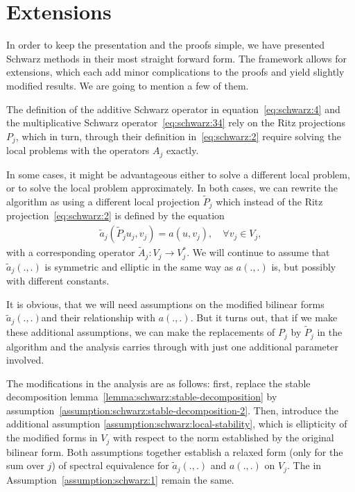 \section{Extensions}

\begin{intro}
  In order to keep the presentation and the proofs simple, we have
  presented Schwarz methods in their most straight forward form. The
  framework allows for extensions, which each add minor
  complications to the proofs and yield slightly modified results. We
  are going to mention a few of them.
\end{intro}

\begin{remark}
  The definition of the additive Schwarz operator in
  equation~\eqref{eq:schwarz:4} and the multiplicative Schwarz
  operator~\eqref{eq:schwarz:34} rely on the Ritz projections $P_j$,
  which in turn, through their definition in~\eqref{eq:schwarz:2}
  require solving the local problems with the operators $A_j$ exactly.
  
  In some cases, it might be advantageous either to solve a different
  local problem, or to solve the local problem approximately. In both
  cases, we can rewrite the algorithm as using a different local
  projection $\widetilde P_j$ which instead of the Ritz
  projection~\eqref{eq:schwarz:2} is defined by the equation
  \begin{gather}
    \label{eq:schwarz:42}
    \widetilde a_j (\widetilde P_j u_j,v_j) = a(u,v_j),\quad\forall v_j\in V_j,
  \end{gather}
  with a corresponding operator $\widetilde A_j: V_j \to V_j^*$. We
  will continue to assume that $\widetilde a_j (.,.)$ is symmetric and
  elliptic in the same way as $a(.,.)$ is, but possibly with different
  constants.

  It is obvious, that we will need assumptions on the modified
  bilinear forms $\widetilde a_j (.,.)$and their relationship with
  $a(.,.)$. But it turns out, that if we make these additional
  assumptions, we can make the replacements of $P_j$ by $\widetilde
  P_j$ in the algorithm and the analysis carries through with just one
  additional parameter involved.
  
  The modifications in the analysis are as follows: first, replace the
  stable decomposition lemma~\ref{lemma:schwarz:stable-decomposition}
  by assumption~\ref{assumption:schwarz:stable-decomposition-2}. Then,
  introduce the additional assumption
  \ref{assumption:schwarz:local-stability}, which is ellipticity of
  the modified forms in $V_j$ with respect to the norm established by the
  original bilinear form. Both assumptions together establish a
  relaxed form (only for the sum over $j$) of spectral equivalence for
  $\widetilde a_j(.,.)$ and $a(.,.)$ on $V_j$. The  in Assumption~\ref{assumption:schwarz:1}
  remain the same.
\end{remark}

